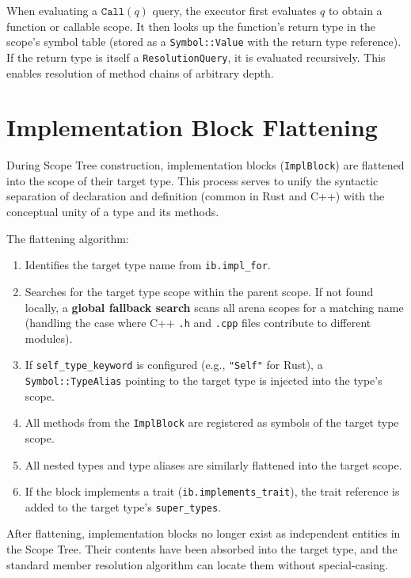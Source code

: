 When evaluating a $\texttt{Call}(q)$ query, the executor first
evaluates $q$ to obtain a function or callable scope. It then looks
up the function's return type in the scope's symbol table (stored as
a \texttt{Symbol::Value} with the return type reference). If the
return type is itself a \texttt{ResolutionQuery}, it is evaluated
recursively. This enables resolution of method chains of arbitrary depth.

\section{Implementation Block Flattening}
\label{sec:impl_flattening}

During Scope Tree construction, implementation blocks
(\texttt{ImplBlock}) are flattened into the scope of their target
type. This process serves to unify the syntactic separation of
declaration and definition (common in Rust and C++) with the
conceptual unity of a type and its methods.

The flattening algorithm:
\begin{enumerate}
  \item Identifies the target type name from \texttt{ib.impl\_for}.
  \item Searches for the target type scope within the parent scope.
    If not found locally, a \textbf{global fallback search} scans all
    arena scopes for a matching name (handling the case where C++
    \texttt{.h} and \texttt{.cpp} files contribute to different modules).
  \item If \texttt{self\_type\_keyword} is configured (e.g.,
    \texttt{"Self"} for Rust), a \texttt{Symbol::TypeAlias} pointing
    to the target type is injected into the type's scope.
  \item All methods from the \texttt{ImplBlock} are registered as
    symbols of the target type scope.
  \item All nested types and type aliases are similarly flattened
    into the target scope.
  \item If the block implements a trait
    (\texttt{ib.implements\_trait}), the trait reference is added to
    the target type's \texttt{super\_types}.
\end{enumerate}

After flattening, implementation blocks no longer exist as
independent entities in the Scope Tree. Their contents have been
absorbed into the target type, and the standard member resolution
algorithm can locate them without special-casing.

